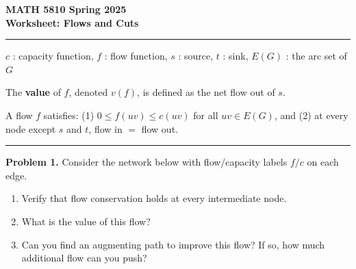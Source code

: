 \documentclass[11pt]{article}
\begin{document}
\begin{center}
  {\large \textbf{MATH 5810 Spring 2025}} \\[4pt]
  {\large \textbf{Worksheet: Flows and Cuts}}
\end{center}

\medskip
\noindent\rule{\textwidth}{0.4pt}

$c$ : capacity function, \quad $f$ : flow function, \quad
$s$ : source, \quad $t$ : sink, \quad $E(G)$ : the arc set of $G$

The \textbf{value} of $f$, denoted $v(f)$, is defined as the
net flow out of $s$.

A flow $f$ satisfies: (1) $0 \le f(uv) \le c(uv)$ for all
$uv \in E(G)$, and (2) at every node except $s$ and $t$,
flow in $=$ flow out.

\noindent\rule{\textwidth}{0.4pt}

\bigskip

\textbf{Problem 1.}
Consider the network below with flow/capacity labels $f/c$ on
each edge.

\begin{center}
\end{center}

\begin{enumerate}
  \item[(a)] Verify that flow conservation holds at every
        intermediate node.
  \item[(b)] What is the value of this flow?
  \item[(c)] Can you find an augmenting path to improve this flow?
        If so, how much additional flow can you push?
\end{enumerate}
\end{document}
